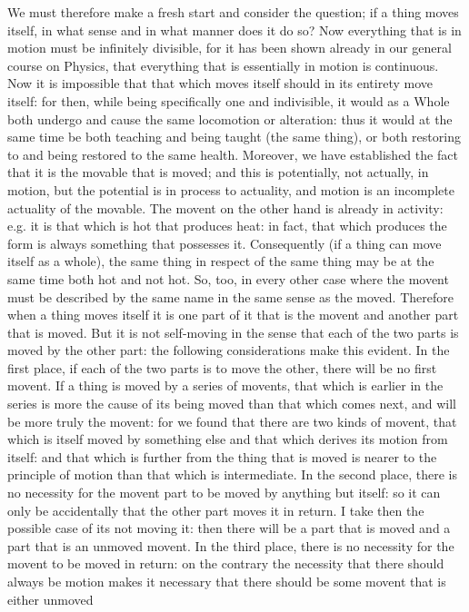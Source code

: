 We must therefore make a fresh start and consider the question; if
a thing moves itself, in what sense and in what manner does it do
so? Now everything that is in motion must be infinitely divisible,
for it has been shown already in our general course on Physics, that
everything that is essentially in motion is continuous. Now it is
impossible that that which moves itself should in its entirety move
itself: for then, while being specifically one and indivisible, it
would as a Whole both undergo and cause the same locomotion or alteration:
thus it would at the same time be both teaching and being taught (the
same thing), or both restoring to and being restored to the same health.
Moreover, we have established the fact that it is the movable that
is moved; and this is potentially, not actually, in motion, but the
potential is in process to actuality, and motion is an incomplete
actuality of the movable. The movent on the other hand is already
in activity: e.g. it is that which is hot that produces heat: in fact,
that which produces the form is always something that possesses it.
Consequently (if a thing can move itself as a whole), the same thing
in respect of the same thing may be at the same time both hot and
not hot. So, too, in every other case where the movent must be described
by the same name in the same sense as the moved. Therefore when a
thing moves itself it is one part of it that is the movent and another
part that is moved. But it is not self-moving in the sense that each
of the two parts is moved by the other part: the following considerations
make this evident. In the first place, if each of the two parts is
to move the other, there will be no first movent. If a thing is moved
by a series of movents, that which is earlier in the series is more
the cause of its being moved than that which comes next, and will
be more truly the movent: for we found that there are two kinds of
movent, that which is itself moved by something else and that which
derives its motion from itself: and that which is further from the
thing that is moved is nearer to the principle of motion than that
which is intermediate. In the second place, there is no necessity
for the movent part to be moved by anything but itself: so it can
only be accidentally that the other part moves it in return. I take
then the possible case of its not moving it: then there will be a
part that is moved and a part that is an unmoved movent. In the third
place, there is no necessity for the movent to be moved in return:
on the contrary the necessity that there should always be motion makes
it necessary that there should be some movent that is either unmoved
